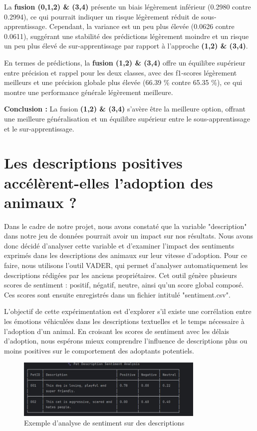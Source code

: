 \documentclass[a4paper,12pt]{article}
\begin{document}
La \textbf{fusion (0,1,2) \& (3,4)} présente un biais légèrement inférieur (0.2980 contre 0.2994), ce qui pourrait indiquer un risque légèrement réduit de sous-apprentissage. Cependant, la variance est un peu plus élevée (0.0626 contre 0.0611), suggérant une stabilité des prédictions légèrement moindre et un risque un peu plus élevé de sur-apprentissage par rapport à l'approche \textbf{(1,2) \& (3,4)}.

En termes de prédictions, la \textbf{fusion (1,2) \& (3,4)} offre un équilibre supérieur entre précision et rappel pour les deux classes, avec des f1-scores légèrement meilleurs et une précision globale plus élevée (66.39 \% contre 65.35 \%), ce qui montre une performance générale légèrement meilleure.

\textbf{Conclusion :} La fusion \textbf{(1,2) \& (3,4)} s’avère être la meilleure option, offrant une meilleure généralisation et un équilibre supérieur entre le sous-apprentissage et le sur-apprentissage.

\section{ Les descriptions positives accélèrent-elles l’adoption des animaux ?
}

Dans le cadre de notre projet, nous avons constaté que la variable "description" dans notre jeu de données pourrait avoir un impact sur nos résultats. Nous avons donc décidé d'analyser cette variable et d'examiner l'impact des sentiments exprimés dans les descriptions des animaux sur leur vitesse d'adoption. Pour ce faire, nous utilisons l'outil VADER, qui permet d'analyser automatiquement les descriptions rédigées par les anciens propriétaires. Cet outil génère plusieurs scores de sentiment : positif, négatif, neutre, ainsi qu'un score global composé. Ces scores sont ensuite enregistrés dans un fichier intitulé "sentiment.csv".

L'objectif de cette expérimentation est d'explorer s'il existe une corrélation entre les émotions véhiculées dans les descriptions textuelles et le temps nécessaire à l'adoption d'un animal. En croisant les scores de sentiment avec les délais d'adoption, nous espérons mieux comprendre l'influence de descriptions plus ou moins positives sur le comportement des adoptants potentiels.


\begin{figure}[H]
    \centering
    \includegraphics[width=0.8\textwidth]{image.jpg}
    \caption{Exemple d'analyse de sentiment sur des descriptions}
    \label{fig:sentiment}
\end{figure}
\end{document}
